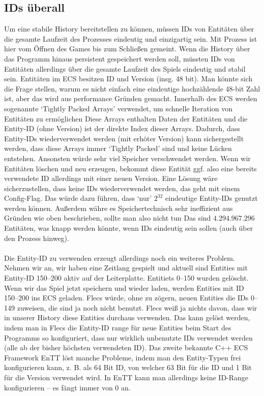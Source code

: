 \documentclass[11pt]{article}
\begin{document}
    \subsection{IDs überall}
    Um eine stabile History bereitstellen zu können, müssen IDs von Entitäten über die gesamte Laufzeit des Prozesses
    eindeutig und einzigartig sein.
    Mit Prozess ist hier vom Öffnen des Games bis zum Schließen gemeint.
    Wenn die History über das Programm hinaus persistent gespeichert werden soll,
    müssten IDs von Entitäten allerdings über die gesamte Laufzeit des Spiels eindeutig und stabil sein.
    Entitäten im ECS besitzen ID und Version (insg. 48 bit).
    Man könnte sich die Frage stellen, warum es nicht einfach eine eindeutige hochzählende 48-bit Zahl ist, aber das wird
    aus performance Gründen gemacht.
    Innerhalb des ECS werden sogenannte `Tightly Packed Arrays' verwendet, um schnelle Iteration von Entitäten zu ermöglichen
    Diese Arrays enthalten Daten der Entitäten und die Entity-ID (ohne Version) ist der direkte Index dieser Arrays.
    Dadurch, dass Entity-IDs wiederverwendet werden (mit erhöter Version) kann sichergestellt werden, dass diese Arrays immer
    `Tightly Packed' sind und keine Lücken entstehen.
    Ansonsten würde sehr viel Speicher verschwendet werden.
    Wenn wir Entitäten löschen und neu erzeugen, bekommt diese Entität ggf. also eine bereits verwendete ID allerdings
    mit einer neuen Version.
    Eine Lösung wäre sicherzustellen, dass keine IDs wiederverwendet werden, das geht mit einem Config-Flag.
    Das würde dazu führen, dass `nur' $2^{32}$ eindeutige Entity-IDs genutzt werden können.
    Außerdem währe es Speichertechnisch sehr ineffizient aus Gründen wie oben beschrieben, sollte man also nicht tun
    Das sind $4.294.967.296$ Entitäten, was knapp werden könnte, wenn IDs eindeutig sein sollen (auch über den Prozess hinweg).

    \paragraph{}
    Die Entity-ID zu verwenden erzeugt allerdings noch ein weiteres Problem.
    Nehmen wir an, wir haben eine Zeitlang gespielt und aktuell sind Entities mit Entity-ID 150--200 aktiv auf der Leiterplatte.
    Entitiets 0--150 wurden gelöscht.
    Wenn wir das Spiel jetzt speichern und wieder laden, werden Entities mit ID 150--200 ins ECS geladen.
    Flecs würde, ohne zu zögern, neuen Entities die IDs 0--149 zuweisen, die sind ja noch nicht benutzt.
    Flecs weiß ja nichts davon, dass wir in unserer History diese Entities durchaus verwenden.
    Das kann gelöst werden, indem man in Flecs die Entity-ID range für neue Entities beim Start des Programms so konfiguriert,
    dass nur wirklich unbenutzte IDs verwendet werden (alle ab der bisher höchsten verwendeten ID).
    Das zweite bekannte C++ ECS Framework EnTT löst manche Probleme, indem man den Entity-Typen frei konfigurieren kann,
    z. B. als 64 Bit ID, von welcher 63 Bit für die ID und 1 Bit für die Version verwendet wird.
    In EnTT kann man allerdings keine ID-Range konfigurieren – es fängt immer von 0 an.
\end{document}
